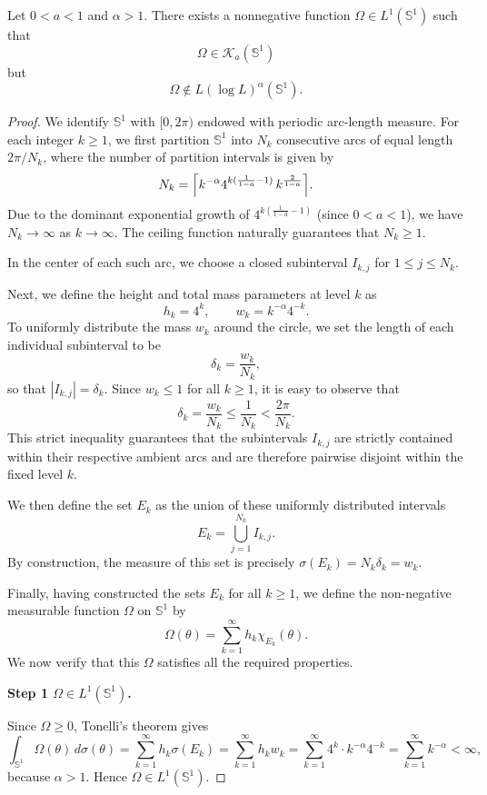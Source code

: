 \documentclass[10pt,a4paper]{amsart}
\begin{document}
\begin{proposition}\label{propforward_1d_orlicz}
	Let $0<a<1$ and $\alpha>1$. There exists a nonnegative function
	$\Omega \in L^1(\mathbb{S}^1)$ such that
	\[
	\Omega\in \mathcal K_a(\mathbb{S}^1)
	\]
	but
	\[
	\Omega\notin L(\log L)^\alpha(\mathbb{S}^1).
	\]
\end{proposition}

\begin{proof}
	We identify $\mathbb{S}^1$ with $[0,2\pi)$ endowed with periodic arc-length measure. For each integer $k \ge 1$, we first partition $\mathbb{S}^1$ into $N_k$ consecutive arcs of equal length $2\pi/N_k$, where the number of partition intervals is given by
	$$N_k = \Bigl\lceil k^{-\alpha}4^{k(\frac{1}{1-a} - 1)}\,k^{\frac{2}{1-a}}\Bigr\rceil.$$
	Due to the dominant exponential growth of $4^{k(\frac{1}{1-a} - 1)}$ (since $0<a<1$), we have $N_k \to \infty$ as $k \to \infty$. The ceiling function naturally guarantees that $N_k \ge 1$. 
	
	In the center of each such arc, we choose a closed subinterval $I_{k,j}$ for $1 \le j \le N_k$. 
	
	Next, we define the height and total mass parameters at level $k$ as
	$$h_k = 4^k, \qquad w_k = k^{-\alpha}4^{-k}.$$
	To uniformly distribute the mass $w_k$ around the circle, we set the length of each individual subinterval to be
	$$\delta_k = \frac{w_k}{N_k},$$
	so that $|I_{k,j}| = \delta_k$. Since $w_k \le 1$ for all $k \ge 1$, it is easy to observe that
	$$\delta_k = \frac{w_k}{N_k} \le \frac{1}{N_k} < \frac{2\pi}{N_k}.$$
	This strict inequality guarantees that the subintervals $I_{k,j}$ are strictly contained within their respective ambient arcs and are therefore pairwise disjoint within the fixed level $k$.
	
	We then define the set $E_k$ as the union of these uniformly distributed intervals
	$$E_k = \bigcup_{j=1}^{N_k} I_{k,j}.$$
	By construction, the measure of this set is precisely $\sigma(E_k) = N_k \delta_k = w_k$.
	
	Finally, having constructed the sets $E_k$ for all $k \ge 1$, we define the non-negative measurable function $\Omega$ on $\mathbb{S}^1$ by
	$$\Omega(\theta) = \sum_{k=1}^\infty h_k \chi_{E_k}(\theta).$$
	We now verify that this $\Omega$ satisfies all the required properties.
	
	\medskip
	\noindent\textbf{Step 1 \(\Omega\in L^1(\mathbb{S}^1)\).}
	
	Since $\Omega\ge 0$, Tonelli's theorem gives
	\[
	\int_{\mathbb{S}^1}\Omega(\theta)\,d\sigma(\theta)
	=\sum_{k=1}^\infty h_k \sigma(E_k)
	=\sum_{k=1}^\infty h_k w_k
	=\sum_{k=1}^\infty 4^k\cdot k^{-\alpha}4^{-k}
	=\sum_{k=1}^\infty k^{-\alpha}<\infty,
	\]
	because $\alpha>1$. Hence $\Omega\in L^1(\mathbb{S}^1)$.
	

\end{proof}
\end{document}
